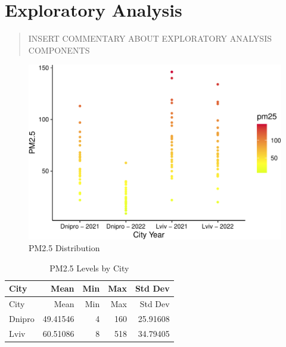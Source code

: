 \documentclass[
  12pt,
]{article}
\begin{document}
\newpage

\hypertarget{exploratory-analysis}{%
\section{Exploratory Analysis}\label{exploratory-analysis}}

\begin{quote}
INSERT COMMENTARY ABOUT EXPLORATORY ANALYSIS COMPONENTS
\end{quote}

\begin{figure}
\centering
\includegraphics{Fontanie_Gordon_Weinberg_Project_files/figure-latex/plot of PM25air pollution levels by CityYear-1.pdf}
\caption{PM2.5 Distribution}
\end{figure}

\hfill\break

\begin{longtable}[]{@{}lrrrr@{}}
\caption{PM2.5 Levels by City}\tabularnewline
\toprule
City & Mean & Min & Max & Std Dev \\
\midrule
\endfirsthead
\toprule
City & Mean & Min & Max & Std Dev \\
\midrule
\endhead
Dnipro & 49.41546 & 4 & 160 & 25.91608 \\
Lviv & 60.51086 & 8 & 518 & 34.79405 \\
\bottomrule
\end{longtable}
\end{document}

